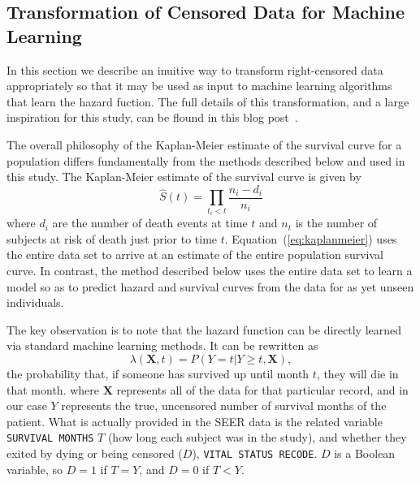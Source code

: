 \documentclass[10pt,letterpaper]{article}
\newcommand{\codewhite}[1]{\colorbox{white}{\texttt{#1}}}
\begin{document}
\subsection*{Transformation of Censored Data for Machine Learning}
\label{subsec:transformation}

In this section we describe an inuitive way to transform right-censored data appropriately so that it may be used as input to machine learning algorithms that learn the hazard fuction. The full details of this transformation, and a large inspiration for this study, can be flound in this blog post~\cite{kuhn}.



The overall philosophy of the Kaplan-Meier estimate of the survival curve for a population differs fundamentally from the methods described below and used in this study. 
The Kaplan-Meier estimate of the survival curve is given by
\begin{equation}
\label{eq:kaplanmeier}
\hat{S}(t) = \prod_{t_i < t} \frac{n_i - d_i}{n_i}
\end{equation}
where $d_i$ are the number of death events at time $t$ and $n_t$ is the number of subjects at risk of death just prior to time $t$. 
Equation~(\ref{eq:kaplanmeier}) uses the entire data set to arrive at an estimate of the entire population survival curve. In contrast, the method described below uses the entire data set to learn a model so as to predict hazard and survival curves from the data for as yet unseen individuals.


The key observation is to note that the hazard function can be directly learned via standard machine learning methods. It can be rewritten as
\begin{equation}
\label{eq:hhazard}
\lambda(\mathbf{X}, t) = P(Y = t|Y \geq t, \mathbf{X}),
\end{equation}
the probability that, if someone has survived up until month $t$, they will die in that month.
where $\mathbf{X}$ represents all of the data for that particular record, and in our case $Y$ represents the true, uncensored number of survival months of the patient.
What is actually provided in the SEER data is the related variable \codewhite{SURVIVAL MONTHS} $T$ (how long each subject was in the study), and whether they exited by dying or being censored ($D$), \codewhite{VITAL STATUS RECODE}. 
$D$ is a Boolean variable, so $D = 1$ if $T = Y$, and $D = 0$ if $T < Y$.
\end{document}
